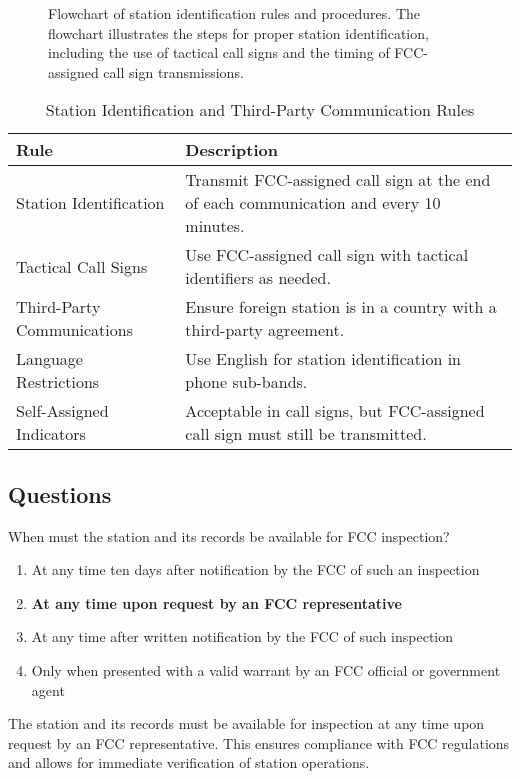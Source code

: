 \begin{figure}[h]
    \centering
    \caption{Flowchart of station identification rules and procedures. The flowchart illustrates the steps for proper station identification, including the use of tactical call signs and the timing of FCC-assigned call sign transmissions.}
    \label{fig:station_identification}
\end{figure}

\begin{table}[h]
    \centering
    \begin{tabular}{|l|l|}
        \hline
        \textbf{Rule} & \textbf{Description} \\
        \hline
        Station Identification & Transmit FCC-assigned call sign at the end of each communication and every 10 minutes. \\
        Tactical Call Signs & Use FCC-assigned call sign with tactical identifiers as needed. \\
        Third-Party Communications & Ensure foreign station is in a country with a third-party agreement. \\
        Language Restrictions & Use English for station identification in phone sub-bands. \\
        Self-Assigned Indicators & Acceptable in call signs, but FCC-assigned call sign must still be transmitted. \\
        \hline
    \end{tabular}
    \caption{Station Identification and Third-Party Communication Rules}
    \label{tab:station_identification}
\end{table}

\subsection*{Questions}
\begin{tcolorbox}[colback=gray!10!white,colframe=black!75!black,title={T1F01}]
    When must the station and its records be available for FCC inspection?
    \begin{enumerate}[label=\Alph*),noitemsep]
        \item At any time ten days after notification by the FCC of such an inspection
        \item \textbf{At any time upon request by an FCC representative}
        \item At any time after written notification by the FCC of such inspection
        \item Only when presented with a valid warrant by an FCC official or government agent
    \end{enumerate}
\end{tcolorbox}
The station and its records must be available for inspection at any time upon request by an FCC representative. This ensures compliance with FCC regulations and allows for immediate verification of station operations.

